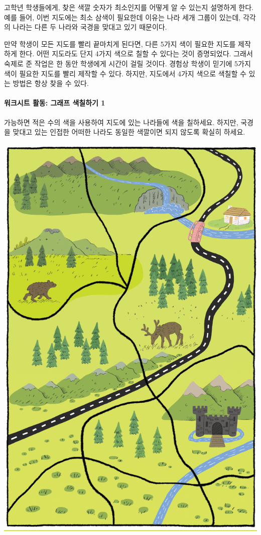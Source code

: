 \documentclass[]{article}
\begin{document}
고학년 학생들에게, 찾은 색깔 숫자가 최소인지를 어떻게 알 수 있는지
설명하게 한다. 예를 들어, 이번 지도에는 최소 삼색이 필요한데 이유는 나라
세개 그룹이 있는데, 각각의 나라는 다른 두 나라와 국경을 맞대고 있기
때문이다.

만약 학생이 모든 지도를 빨리 끝마치게 된다면, 다른 5가지 색이 필요한
지도를 제작하게 한다. 어떤 지도라도 단지 4가지 색으로 칠할 수 있다는
것이 증명되었다. 그래서 숙제로 준 작업은 한 동안 학생에게 시간이 걸릴
것이다. 경험상 학생이 믿기에 5가지 색이 필요한 지도를 빨리 제작할 수
있다. 하지만, 지도에서 4가지 색으로 색칠할 수 있는 방법은 항상 찾을 수
있다.

\mbox{}\paragraph{워크시트 활동: 그래프 색칠하기 1}\label{section-190}

가능하면 적은 수의 색을 사용하여 지도에 있는 나라들에 색을 칠하세요.
하지만, 국경을 맞대고 있는 인접한 어떠한 나라도 동일한 색깔이면 되지
않도록 확실히 하세요.

\includegraphics{csunplugged/04-part/img/ch14-coloring/13-coloring-03-coloring-countries.png}
\end{document}
